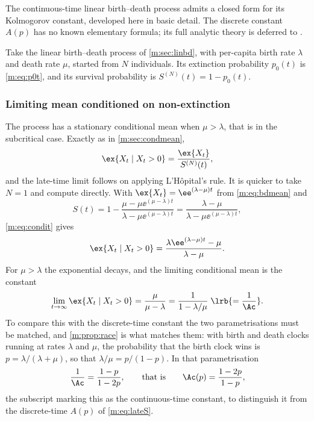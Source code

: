 The continuous-time linear birth--death process admits a closed form for its
Kolmogorov constant, developed here in basic detail. The discrete constant $A(p)$
has no known elementary formula; its full analytic theory is deferred to \ChA.

Take the linear birth--death process of \cref{m:sec:linbd}, with per-capita birth
rate $\lambda$ and death rate $\mu$, started from $N$ individuals. Its extinction
probability $p_0(t)$ is \cref{m:eq:p0t}, and its survival probability is
$S^{(N)}(t) = 1-p_0(t)$.

\subsubsection*{Limiting mean conditioned on non-extinction}

The process has a stationary conditional mean when $\mu>\lambda$, that is in the
subcritical case. Exactly as in \cref{m:sec:condmean},
\begin{equation}
\label{m:eq:condit}
\ex{X_t\mid X_t>0} = \frac{\ex{X_t}}{S^{(N)}(t)},
\end{equation}
and the late-time limit follows on applying L'Hôpital's rule. It is quicker to take
$N=1$ and compute directly. With $\ex{X_t}=\ee^{(\lambda-\mu)t}$ from
\cref{m:eq:bdmean} and
\begin{equation*}
S(t) = 1-\frac{\mu-\mu\ee^{(\mu-\lambda)t}}{\lambda-\mu\ee^{(\mu-\lambda)t}}
= \frac{\lambda-\mu}{\lambda-\mu\ee^{(\mu-\lambda)t}},
\end{equation*}
\cref{m:eq:condit} gives
\begin{equation*}
\ex{X_t\mid X_t>0} = \frac{\lambda\ee^{(\lambda-\mu)t}-\mu}{\lambda-\mu} .
\end{equation*}
For $\mu>\lambda$ the exponential decays, and the limiting conditional mean is the
constant
\begin{equation}
\label{m:eq:ctsqsmean}
\lim_{t\to\infty}\ex{X_t\mid X_t>0} = \frac{\mu}{\mu-\lambda}
= \frac{1}{1-\lambda/\mu}
\;\lrb{=\frac{1}{\Ac}} .
\end{equation}
To compare this with the discrete-time constant the two parametrisations must be
matched, and \cref{m:prop:race} is what matches them: with birth and death clocks
running at rates $\lambda$ and $\mu$, the probability that the birth clock wins is
$p = \lambda/(\lambda+\mu)$, so that $\lambda/\mu = p/(1-p)$. In that
parametrisation
\begin{equation}
\label{m:eq:Acts}
\frac{1}{\Ac} = \frac{1-p}{1-2p},
\qquad\text{that is}\qquad
\Ac(p) = \frac{1-2p}{1-p} ,
\end{equation}
the subscript marking this as the continuous-time constant, to distinguish it from
the discrete-time $A(p)$ of \cref{m:eq:lateS}.

